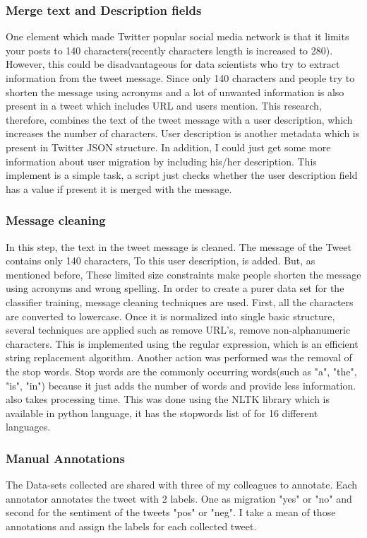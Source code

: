 \subsubsection{Merge text and Description fields}

One element which made Twitter popular social media network is that it limits your posts to 140 characters(recently characters length is increased to 280). However, this could be disadvantageous for data scientists who try to extract information from the tweet message. Since only 140 characters and people try to shorten the message using acronyms and a lot of unwanted information is also present in a tweet which includes URL and users mention. This research, therefore, combines the text of the tweet message with a user description, which increases the number of characters. User description is another metadata which is present in Twitter JSON structure. In addition, I could just get some more information about user migration by including his/her description. This implement is a simple task, a script just checks whether the user description field has a value if present it is merged with the message.

\subsubsection{Message cleaning}
In this step, the text in the tweet message is cleaned. The message of the Tweet contains only 140 characters, To this user description, is added. But, as mentioned before, These limited size constraints make people shorten the message using acronyms and wrong spelling. 
In order to create a purer data set for the classifier training, message cleaning techniques are used. First, all the characters are converted to lowercase. Once it is normalized into single basic structure, several techniques are applied such as remove URL's, remove non-alphanumeric characters. This is implemented using the regular expression, which is an efficient string replacement algorithm. Another action was performed was the removal of the stop words. Stop words are the commonly occurring words(such as "a", "the", "is", "in") because it just adds the number of words and provide less information. also takes processing time. This was done using the NLTK library which is available in python language, it has the stopwords list of for 16 different languages. 
\subsubsection{Manual Annotations}
The Data-sets collected are shared with three of my colleagues to annotate. Each annotator annotates the tweet with 2 labels. One as migration "yes" or "no" and second for the sentiment of the tweets "pos" or "neg". I take a mean of those annotations and assign the labels for each collected tweet.

